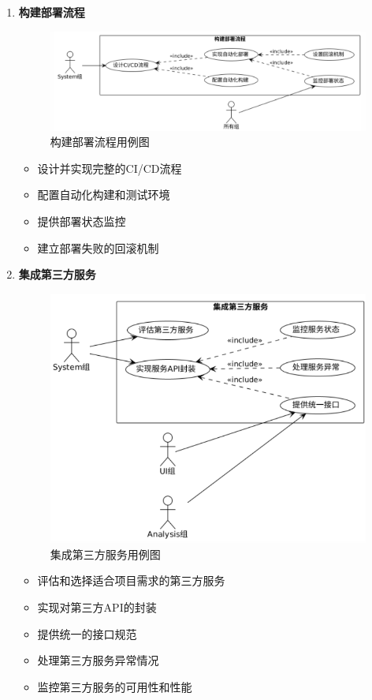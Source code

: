 \documentclass[a4paper,12pt]{article}
\begin{document}
\begin{enumerate}
  \item \textbf{构建部署流程}
  
  \begin{figure}[H]
    \centering
    \includegraphics[width=0.75\linewidth]{assets/image1.png}
    \caption{构建部署流程用例图}
    \label{fig:deployment-process}
  \end{figure}
  
  \begin{itemize}
    \item 设计并实现完整的CI/CD流程
    \item 配置自动化构建和测试环境
    \item 提供部署状态监控
    \item 建立部署失败的回滚机制
  \end{itemize}
  
  \item \textbf{集成第三方服务}
  
  \begin{figure}[H]
    \centering
    \includegraphics[width=0.75\linewidth]{assets/image11.png}
    \caption{集成第三方服务用例图}
    \label{fig:third-party-services}
  \end{figure}
  
  \begin{itemize}
    \item 评估和选择适合项目需求的第三方服务
    \item 实现对第三方API的封装
    \item 提供统一的接口规范
    \item 处理第三方服务异常情况
    \item 监控第三方服务的可用性和性能
  \end{itemize}
  

\end{enumerate}
\end{document}
